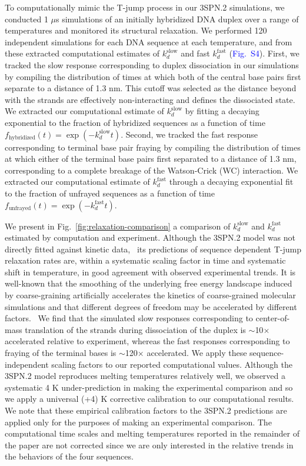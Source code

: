 \documentclass[journal=jpcbfk,manuscript=article]{achemso}
\newcommand*{\blauw}[1]{\textcolor{blue}{#1}}
\begin{document}
To computationally mimic the T-jump process in our 3SPN.2 simulations, we conducted 1 $\mu$s simulations of an initially hybridized DNA duplex over a range of temperatures and monitored its structural relaxation. We performed 120 independent simulations for each DNA sequence at each temperature, and from these extracted computational estimates of $k_d^\mathrm{slow}$ and fast $k_d^\mathrm{fast}$ (\blauw{Fig.~S4}). First, we tracked the slow response corresponding to duplex dissociation in our simulations by compiling the distribution of times at which both of the central base pairs first separate to a distance of 1.3 nm. This cutoff was selected as the distance beyond with the strands are effectively non-interacting and defines the dissociated state. We extracted our computational estimate of $k_d^\mathrm{slow}$ by fitting a decaying exponential to the fraction of hybridized sequences as a function of time $f_\mathrm{hybridized}(t) = \exp(-k_d^\mathrm{slow}t)$. Second, we tracked the fast response corresponding to terminal base pair fraying by compiling the distribution of times at which either of the terminal base pairs first separated to a distance of 1.3 nm, corresponding to a complete breakage of the Watson-Crick (WC) interaction. We extracted our computational estimate of $k_d^\mathrm{fast}$ through a decaying exponential fit to the fraction of unfrayed sequences as a function of time $f_\mathrm{unfrayed}(t) = \exp(-k_d^\mathrm{fast}t)$. 

We present in Fig.~\ref{fig:relaxation-comparison} a comparison of $k_d^\mathrm{slow}$ and $k_d^\mathrm{fast}$ estimated by computation and experiment. Although the 3SPN.2 model was not directly fitted against kinetic data,~\cite{Hinckley2013AnHybridization} its predictions of sequence dependent T-jump relaxation rates are, within a systematic scaling factor in time and systematic shift in temperature, in good agreement with observed experimental trends. It is well-known that the smoothing of the underlying free energy landscape induced by coarse-graining artificially accelerates the kinetics of coarse-grained molecular simulations and that different degrees of freedom may be accelerated by different factors.~\citep{Marrink2007TheSimulations, Fritz2011MultiscaleDynamics, Marrink2013PerspectiveModel} We find that the simulated slow responses corresponding to center-of-mass translation of the strands during dissociation of the duplex is $\sim$10$\times$ accelerated relative to experiment, whereas the fast responses corresponding to fraying of the terminal bases is $\sim$120$\times$ accelerated. We apply these sequence-independent scaling factors to our reported computational values. Although the 3SPN.2 model reproduces melting temperatures relatively well, we observed a systematic 4 K under-prediction in making the experimental comparison and so we apply a universal (+4) K corrective calibration to our computational results. We note that these empirical calibration factors to the 3SPN.2 predictions are applied only for the purposes of making an experimental comparison. The computational time scales and melting temperatures reported in the remainder of the paper are not corrected since we are only interested in the relative trends in the behaviors of the four sequences.
\end{document}
